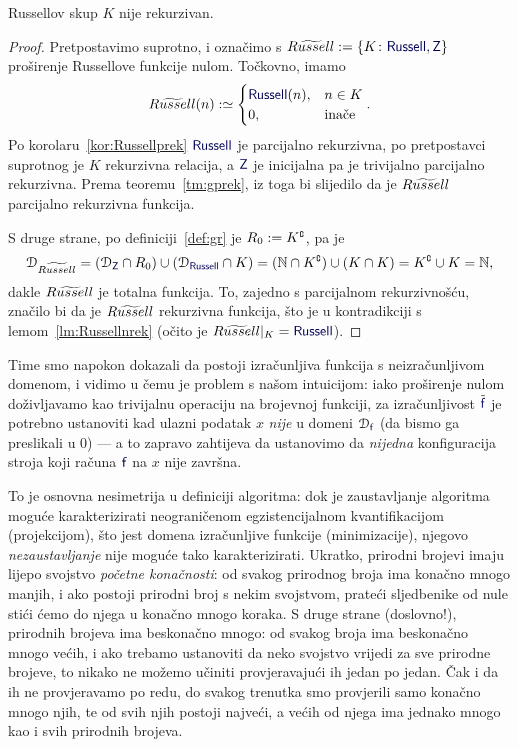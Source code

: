 \begin{teorem}[{name=[nerekurzivnost Russellovog skupa]}]\label{tm:DRnrek}
Russellov skup $K$ nije rekurzivan.
\end{teorem}
\begin{proof}
Pretpostavimo suprotno, i označimo s $\rus:=\{K\colon\f{Russell},\f Z\}$ proširenje Russellove funkcije nulom.
Točkovno, imamo
\begin{equation}
    \rus(n):\simeq
\begin{cases}
\f{Russell}(n),&n\in K\\
0,&\text{inače}
\end{cases}\text.
\end{equation}
Po korolaru~\ref{kor:Russellprek} $\f{Russell}$ je parcijalno rekurzivna, po pretpostavci suprotnog je $K$ rekurzivna relacija, a $\f Z$ je inicijalna pa je trivijalno parcijalno rekurzivna. Prema teoremu~\ref{tm:gprek}, iz toga bi slijedilo da je $\textit{$R\widetilde{usse}ll$}$ parcijalno rekurzivna funkcija. 

S druge strane, po definiciji~\ref{def:gr} je $R_0:=K\sp{{\scriptscriptstyle\complement}}$, pa je
\begin{equation}
    \dom{\rus}=(\dom{\f Z}\cap R_0)\cup(\dom{\f{Russell}}\cap K)=(\N\cap K\kompl)\cup(K\cap K)=K\kompl\cup K=\N\text,
\end{equation}
dakle $\textit{$R\widetilde{usse}ll$}$ je totalna funkcija. To, zajedno s parcijalnom rekurzivnošću, značilo bi da je $\textit{$R\widetilde{usse}ll$}$ rekurzivna funkcija, što je u kontradikciji s lemom~\ref{lm:Russellnrek} (očito je $\rus|_{K}=\f{Russell}$).
\end{proof}

Time smo napokon dokazali da postoji izračunljiva funkcija s neizračunljivom domenom, i vidimo u čemu je problem s našom intuicijom: iako proširenje nulom doživljavamo kao trivijalnu operaciju na brojevnoj funkciji, za izračunljivost $\tilde{\f f}$ je potrebno ustanoviti kad ulazni podatak $x$ \emph{nije} u domeni $\dom{\f f}$ (da bismo ga preslikali u $0$) --- a to zapravo zahtijeva da ustanovimo da \emph{nijedna} konfiguracija stroja koji računa $\f f$ na $x$ nije završna. 

To je osnovna nesimetrija u definiciji algoritma: dok je zaustavljanje algoritma moguće karakterizirati neograničenom egzistencijalnom kvantifikacijom (projekcijom), što jest domena izračunljive funkcije (minimizacije), njegovo \emph{nezaustavljanje} nije moguće tako karakterizirati. Ukratko, prirodni brojevi imaju lijepo svojstvo \emph{početne konačnosti}: od svakog prirodnog broja ima konačno mnogo manjih, i ako postoji prirodni broj s nekim svojstvom, prateći sljedbenike od nule stići ćemo do njega u konačno mnogo koraka. S druge strane (doslovno!), prirodnih brojeva ima beskonačno mnogo: od svakog broja ima beskonačno mnogo većih, i ako trebamo ustanoviti da neko svojstvo vrijedi za sve prirodne brojeve, to nikako ne možemo učiniti provjeravajući ih jedan po jedan. Čak i da ih ne provjeravamo po redu, do svakog trenutka smo provjerili samo konačno mnogo njih, te od svih njih postoji najveći, a većih od njega ima jednako mnogo kao i svih prirodnih brojeva.

